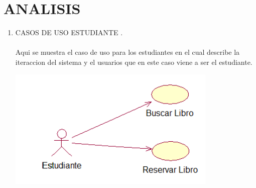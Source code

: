 \section{ANALISIS} 

\begin{enumerate}[1.]
	\item CASOS DE USO ESTUDIANTE .\\\\
		Aqui se muestra el caso de uso para los estudiantes en el cual describe la iteraccion del sistema y el usuarios que en 			este caso viene a ser el estudiante.
	\begin{center}
	
	\includegraphics[width=10cm]{./Imagenes/img1} 
	\end{center}
	

\end{enumerate}
